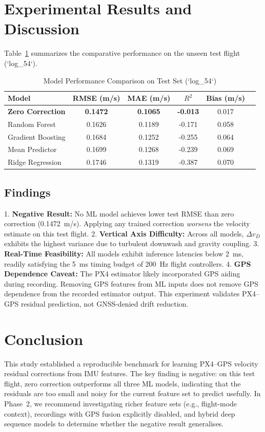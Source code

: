 \documentclass[conference]{IEEEtran}
\begin{document}
\section{Experimental Results and Discussion}
Table~\ref{tab:results} summarizes the comparative performance on the unseen test flight (`log\_54`).

\begin{table}[htbp]
\caption{Model Performance Comparison on Test Set (`log\_54`)}
\begin{center}
\begin{tabular}{lccccc}
\toprule
\textbf{Model} & \textbf{RMSE (m/s)} & \textbf{MAE (m/s)} & \textbf{$R^2$} & \textbf{Bias (m/s)} \\
\midrule
\textbf{Zero Correction} & \textbf{0.1472} & \textbf{0.1065} & \textbf{-0.013} & 0.017 \\
Random Forest & 0.1626 & 0.1189 & -0.171 & 0.058 \\
Gradient Boosting & 0.1684 & 0.1252 & -0.255 & 0.064 \\
Mean Predictor & 0.1699 & 0.1268 & -0.239 & 0.069 \\
Ridge Regression & 0.1746 & 0.1319 & -0.387 & 0.070 \\
\bottomrule
\end{tabular}
\label{tab:results}
\end{center}
\end{table}

\subsection{Findings}
1. \textbf{Negative Result:} No ML model achieves lower test RMSE than zero correction (0.1472~m/s). Applying any trained correction \textit{worsens} the velocity estimate on this test flight.
2. \textbf{Vertical Axis Difficulty:} Across all models, $\Delta v_D$ exhibits the highest variance due to turbulent downwash and gravity coupling.
3. \textbf{Real-Time Feasibility:} All models exhibit inference latencies below 2~ms, readily satisfying the 5~ms timing budget of 200~Hz flight controllers.
4. \textbf{GPS Dependence Caveat:} The PX4 estimator likely incorporated GPS aiding during recording. Removing GPS features from ML inputs does not remove GPS dependence from the recorded estimator output. This experiment validates PX4--GPS residual prediction, not GNSS-denied drift reduction.

\section{Conclusion}
This study established a reproducible benchmark for learning PX4--GPS velocity residual corrections from IMU features. The key finding is negative: on this test flight, zero correction outperforms all three ML models, indicating that the residuals are too small and noisy for the current feature set to predict usefully. In Phase~2, we recommend investigating richer feature sets (e.g., flight-mode context), recordings with GPS fusion explicitly disabled, and hybrid deep sequence models to determine whether the negative result generalises.
\end{document}

